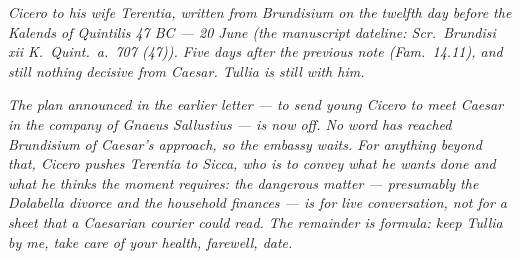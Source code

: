 
\textit{Cicero to his wife Terentia, written from
Brundisium on the twelfth day before the Kalends of
Quintilis 47 BC --- 20 June (the manuscript dateline:
\textit{Scr.\ Brundisi xii K.\ Quint.\ a.\ 707 (47)}).
Five days after the previous note (Fam.\ 14.11), and
still nothing decisive from Caesar. Tullia is still
with him.}

\textit{The plan announced in the earlier letter --- to
send young Cicero to meet Caesar in the company of
Gnaeus Sallustius --- is now off. No word has reached
Brundisium of Caesar's approach, so the embassy waits.
For anything beyond that, Cicero pushes Terentia to
Sicca, who is to convey what he wants done and what he
thinks the moment requires: the dangerous matter ---
presumably the Dolabella divorce and the household
finances --- is for live conversation, not for a sheet
that a Caesarian courier could read. The remainder is
formula: keep Tullia by me, take care of your health,
farewell, date.}
